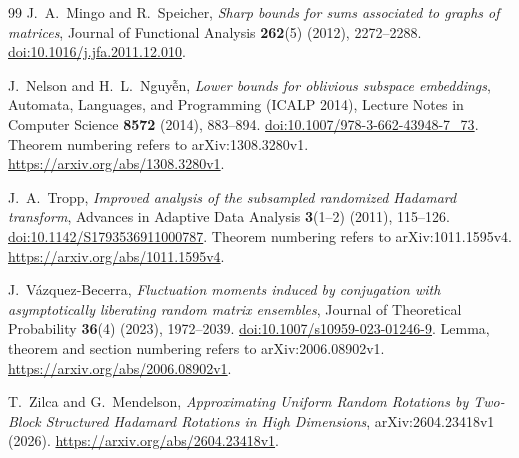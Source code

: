 \documentclass[11pt]{article}
\theoremstyle{definition}
\theoremstyle{remark}
\theoremstyle{plain}
\begin{document}
\begin{thebibliography}{99}
J.~A.~Mingo and R.~Speicher,
\emph{Sharp bounds for sums associated to graphs of matrices},
Journal of Functional Analysis \textbf{262}(5) (2012), 2272--2288.
\href{https://doi.org/10.1016/j.jfa.2011.12.010}{doi:10.1016/j.jfa.2011.12.010}.

J.~Nelson and H.~L.~Nguy\~{\^e}n,
\emph{Lower bounds for oblivious subspace embeddings},
Automata, Languages, and Programming (ICALP 2014),
Lecture Notes in Computer Science \textbf{8572} (2014), 883--894.
\href{https://doi.org/10.1007/978-3-662-43948-7_73}{doi:10.1007/978-3-662-43948-7\_73}.
Theorem numbering refers to arXiv:1308.3280v1.
\url{https://arxiv.org/abs/1308.3280v1}.

J.~A.~Tropp,
\emph{Improved analysis of the subsampled randomized Hadamard
transform}, Advances in Adaptive Data Analysis \textbf{3}(1--2)
(2011), 115--126.
\href{https://doi.org/10.1142/S1793536911000787}{doi:10.1142/S1793536911000787}.
Theorem numbering refers to arXiv:1011.1595v4.
\url{https://arxiv.org/abs/1011.1595v4}.

J.~V\'azquez-Becerra,
\emph{Fluctuation moments induced by conjugation with asymptotically
liberating random matrix ensembles},
Journal of Theoretical Probability \textbf{36}(4) (2023), 1972--2039.
\href{https://doi.org/10.1007/s10959-023-01246-9}{doi:10.1007/s10959-023-01246-9}.
Lemma, theorem and section numbering refers to arXiv:2006.08902v1.
\url{https://arxiv.org/abs/2006.08902v1}.

T.~Zilca and G.~Mendelson,
\emph{Approximating Uniform Random Rotations by Two-Block
Structured Hadamard Rotations in High Dimensions},
arXiv:2604.23418v1 (2026).
\url{https://arxiv.org/abs/2604.23418v1}.

\end{thebibliography}
\end{document}
